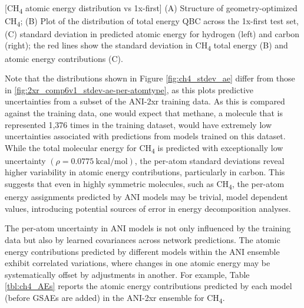 \begin{flushleft}
\begin{multiFigure}
     \\
[CH\textsubscript{4} atomic energy distribution vs 1x-first]{
(A) Structure of geometry-optimized CH\textsubscript{4}; 
(B) Plot of the distribution of total energy QBC across the 1x-first test set, 
(C) standard deviation in predicted atomic energy for hydrogen (left) and carbon (right); 
the red lines show the standard deviation in CH\textsubscript{4} total energy (B) and atomic energy contributions (C).
}
\label{fig:ch4_stdev_ae}
\end{multiFigure}
\end{flushleft}

Note that the distributions shown in Figure \ref{fig:ch4_stdev_ae} differ from those in \ref{fig:2xr_comp6v1_stdev-ae-per-atomtype}, as this plots predictive uncertainties from a subset of the ANI-2xr training data.
As this is compared against the training data, one would expect that methane, a molecule that is represented 1,376 times in the training dataset, would have extremely low uncertainties associated with predictions from models trained on this dataset.
While the total molecular energy for CH\textsubscript{4} is predicted with exceptionally low uncertainty $\left( \rho = 0.0775 \ \text{kcal/mol} \right)$, the per-atom standard deviations reveal higher variability in atomic energy contributions, particularly in carbon.
This suggests that even in highly symmetric molecules, such as CH\textsubscript{4}, the per-atom energy assignments predicted by ANI models may be trivial, model dependent values, introducing potential sources of error in energy decomposition analyses.

The per-atom uncertainty in ANI models is not only influenced by the training data but also by learned covariances across network predictions. 
The atomic energy contributions predicted by different models within the ANI ensemble exhibit correlated variations, where changes in one atomic energy may be systematically offset by adjustments in another.
For example, Table \ref{tbl:ch4_AEs} reports the atomic energy contributions predicted by each model (before GSAEs are added) in the ANI-2xr ensemble for CH\textsubscript{4}.

